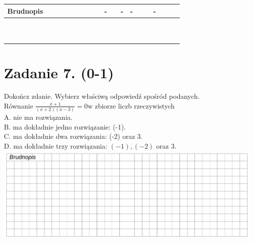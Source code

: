 \documentclass[10pt]{article}
\begin{document}
\begin{center}
\begin{tabular}{|c|c|c|c|c|c|c|c|c|c|c|c|c|c|c|c|c|c|c|c|c|c|}
\hline
\multicolumn{4}{|l|}{Brudnopis} &  &  &  &  &  &  &  &  & - &  & - & - &  &  & - &  &  &  \\
\hline
 &  &  &  &  &  &  &  &  &  &  &  &  &  &  &  &  &  &  &  &  &  \\
\hline
 &  &  &  &  &  &  &  &  &  &  &  &  &  &  &  &  &  &  &  &  &  \\
\hline
 &  &  &  &  &  &  &  &  &  &  &  &  &  &  &  &  &  &  &  &  &  \\
\hline
 &  &  &  &  &  &  &  &  &  &  &  &  &  &  &  &  &  &  &  &  &  \\
\hline
 &  &  &  &  &  &  &  &  &  &  &  &  &  &  &  &  &  &  &  &  &  \\
\hline
 &  &  &  &  &  &  &  &  &  &  &  &  &  &  &  &  &  &  &  &  &  \\
\hline
 &  &  &  &  &  &  &  &  &  &  &  &  &  &  &  &  &  &  &  &  &  \\
\hline
 &  &  &  &  &  &  &  &  &  &  &  &  &  &  &  &  &  &  &  &  &  \\
\hline
 &  &  &  &  &  &  &  &  &  &  &  &  &  &  &  &  &  &  &  &  &  \\
\hline
 &  &  &  &  &  &  &  &  &  &  &  &  &  &  &  &  &  &  &  &  &  \\
\hline
\end{tabular}
\end{center}

\section*{Zadanie 7. (0-1)}
Dokończ zdanie. Wybierz właściwą odpowiedź spośród podanych.\\
Równanie \(\frac{x+1}{(x+2)(x-3)}=0 \mathrm{w}\) zbiorze liczb rzeczywistych\\
A. nie ma rozwiązania.\\
B. ma dokładnie jedno rozwiązanie: (-1).\\
C. ma dokładnie dwa rozwiązania: (-2) oraz 3.\\
D. ma dokładnie trzy rozwiązania: \((-1),(-2)\) oraz 3.\\
\includegraphics[max width=\textwidth, center]{2024_11_21_daeb5e5efb43dd4cb535g-07}
\end{document}
